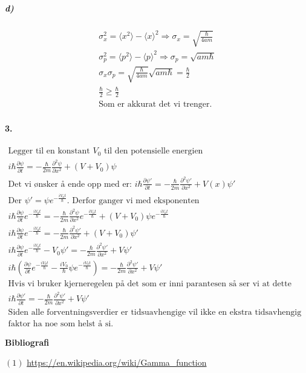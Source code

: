 \documentclass[11pt, A4paper,norsk]{article}
\begin{document}
			\subparagraph{d)}
				\begin{gather*}
\sigma_x^2 = \langle x^2 \rangle - \langle x \rangle^2 \Rightarrow \sigma_x = \sqrt{\frac{\hbar}{4am}} \\
\sigma_p^2 = \langle p^2 \rangle - \langle p \rangle^2 \Rightarrow \sigma_p = \sqrt{am\hbar} \\
\sigma_x \sigma_p = \sqrt{\frac{\hbar}{4am}} \sqrt{am\hbar} = \frac{\hbar}{2} \\
\frac{\hbar}{2} \geq \frac{\hbar}{2} \\
\text{Som er akkurat det vi trenger.}
				\end{gather*}











		\paragraph{3.}
			\begin{gather*}
\text{Legger til en konstant $V_0$ til den potensielle energien} \\
i \hbar \frac{\partial \psi}{\partial t} = - \frac{\hbar}{2m} \frac{\partial^2 \psi}{\partial x^2} + \left( V + V_0 \right) \psi \\
\text{Det vi ønsker å ende opp med er: $i \hbar \frac{\partial \psi'}{\partial t} = - \frac{\hbar}{2m} \frac{\partial^2 \psi'}{\partial x^2} + V(x) \psi'$} \\
\text{Der $\psi' = \psi e^{-\frac{iV_0t}{\hbar}}$. Derfor ganger vi med eksponenten} \\
i \hbar \frac{\partial \psi}{\partial t} e^{-\frac{iV_0t}{\hbar}} = - \frac{\hbar}{2m} \frac{\partial^2 \psi}{\partial x^2} e^{-\frac{iV_0t}{\hbar}} + \left( V + V_0 \right) \psi e^{-\frac{iV_0t}{\hbar}} \\
i \hbar \frac{\partial \psi}{\partial t} e^{-\frac{iV_0t}{\hbar}} = - \frac{\hbar}{2m} \frac{\partial^2 \psi'}{\partial x^2} + \left( V + V_0 \right) \psi' \\
i \hbar \frac{\partial \psi}{\partial t} e^{-\frac{iV_0t}{\hbar}} - V_0 \psi' = - \frac{\hbar}{2m} \frac{\partial^2 \psi'}{\partial x^2} + V \psi' \\
i \hbar \left( \frac{\partial \psi}{\partial t} e^{-\frac{iV_0t}{\hbar}} - \frac{iV_0}{\hbar} \psi e^{-\frac{iV_0t}{\hbar}} \right) = - \frac{\hbar}{2m} \frac{\partial^2 \psi'}{\partial x^2} + V \psi' \\
\text{Hvis vi bruker kjerneregelen på det som er inni parantesen så ser vi at dette blir lik} \\
i \hbar \frac{\partial \psi'}{\partial t} = - \frac{\hbar}{2m} \frac{\partial^2 \psi'}{\partial x^2} + V \psi' \\
\text{Siden alle forventningsverdier er tidsuavhengige vil ikke en ekstra tidsavhengig} \\
\text{faktor ha noe som helst å si.}
			\end{gather*}







	\begin{center}
\Large \textbf{Bibliografi}
	\end{center}
		\begin{flushleft}
$(1)$ \url{https://en.wikipedia.org/wiki/Gamma_function}
		\end{flushleft}
\end{document}
